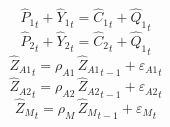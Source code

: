 \begin{dmath}
{{\hat{P}_{1}}}_{t}+{{\hat{Y}_{1}}}_{t}={{\hat{C}_{1}}}_{t}+{{\hat{Q}_{1}}}_{t}
\end{dmath}
\begin{dmath}
{{\hat{P}_{2}}}_{t}+{{\hat{Y}_{2}}}_{t}={{\hat{C}_{2}}}_{t}+{{\hat{Q}_{1}}}_{t}
\end{dmath}
\begin{dmath}
{{\hat{Z}_{A1}}}_{t}={{\rho_{A1}}}\, {{\hat{Z}_{A1}}}_{t-1}+{{\varepsilon_{A1}}}_{t}
\end{dmath}
\begin{dmath}
{{\hat{Z}_{A2}}}_{t}={{\rho_{A2}}}\, {{\hat{Z}_{A2}}}_{t-1}+{{\varepsilon_{A2}}}_{t}
\end{dmath}
\begin{dmath}
{{\hat{Z}_M}}_{t}={{\rho_{M}}}\, {{\hat{Z}_M}}_{t-1}+{{\varepsilon_{M}}}_{t}
\end{dmath}
